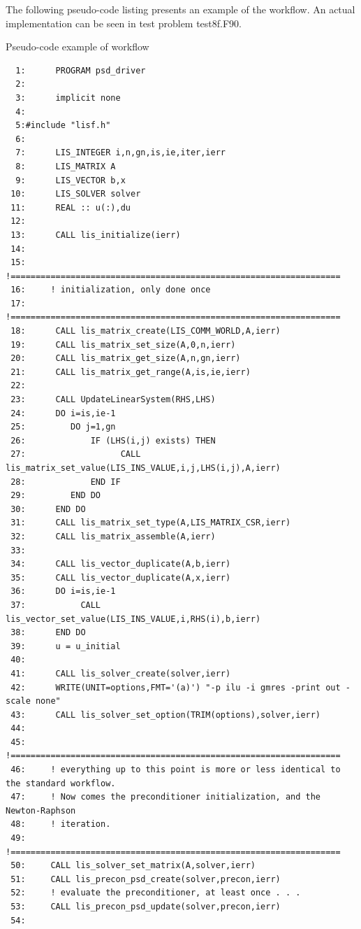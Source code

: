 \documentclass[a4paper]{article}
\begin{document}
\vspace{1pc}

The following pseudo-code listing presents an example of the workflow.
An actual implementation can be seen in test problem test8f.F90.

\vspace{1pc}

\begin{itemsquarebox}[l]{Pseudo-code example of workflow}
{\small
\begin{verbatim}
  1:      PROGRAM psd_driver
  2:
  3:      implicit none
  4:      
  5:#include "lisf.h"
  6:
  7:      LIS_INTEGER i,n,gn,is,ie,iter,ierr
  8:      LIS_MATRIX A
  9:      LIS_VECTOR b,x
 10:      LIS_SOLVER solver
 11:      REAL :: u(:),du
 12:
 13:      CALL lis_initialize(ierr)
 14:
 15:     !==================================================================
 16:     ! initialization, only done once
 17:     !==================================================================
 18:      CALL lis_matrix_create(LIS_COMM_WORLD,A,ierr)
 19:      CALL lis_matrix_set_size(A,0,n,ierr)
 20:      CALL lis_matrix_get_size(A,n,gn,ierr)
 21:      CALL lis_matrix_get_range(A,is,ie,ierr)
 22:
 23:      CALL UpdateLinearSystem(RHS,LHS)
 24:      DO i=is,ie-1
 25:         DO j=1,gn
 26:             IF (LHS(i,j) exists) THEN
 27:                   CALL lis_matrix_set_value(LIS_INS_VALUE,i,j,LHS(i,j),A,ierr)
 28:             END IF
 29:         END DO
 30:      END DO
 31:      CALL lis_matrix_set_type(A,LIS_MATRIX_CSR,ierr)
 32:      CALL lis_matrix_assemble(A,ierr)
 33:
 34:      CALL lis_vector_duplicate(A,b,ierr)
 35:      CALL lis_vector_duplicate(A,x,ierr)
 36:      DO i=is,ie-1
 37:           CALL lis_vector_set_value(LIS_INS_VALUE,i,RHS(i),b,ierr)
 38:      END DO
 39:      u = u_initial
 40:
 41:      CALL lis_solver_create(solver,ierr)
 42:      WRITE(UNIT=options,FMT='(a)') "-p ilu -i gmres -print out -scale none"
 43:      CALL lis_solver_set_option(TRIM(options),solver,ierr)
 44:
 45:     !==================================================================
 46:     ! everything up to this point is more or less identical to the standard workflow.
 47:     ! Now comes the preconditioner initialization, and the Newton-Raphson
 48:     ! iteration.
 49:     !==================================================================
 50:     CALL lis_solver_set_matrix(A,solver,ierr)
 51:     CALL lis_precon_psd_create(solver,precon,ierr)
 52:     ! evaluate the preconditioner, at least once . . .
 53:     CALL lis_precon_psd_update(solver,precon,ierr)
 54:
\end{verbatim}
}
\end{itemsquarebox}
\end{document}
